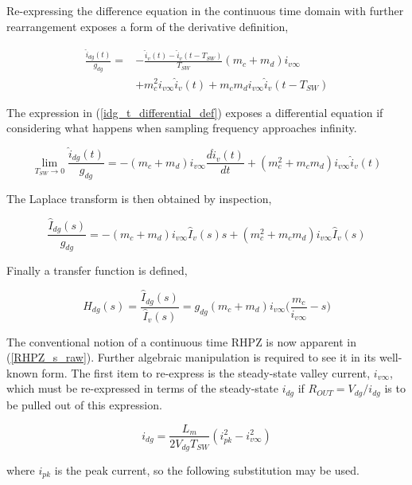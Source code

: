 \documentclass[conference]{IEEEtran}
\begin{document}
Re-expressing the difference equation in the continuous time domain with further rearrangement exposes a form of the derivative definition,

\begin{align}
	\frac{\hat{i}_{dg}(t)}{g_{dg}} =&  -\frac{\hat{i}_v(t) - \hat{i}_v (t-T_{SW})} {T_{SW}}
	(m_c + m_d) i_{v\infty} \nonumber \\
	&+	m_c^2 i_{v\infty}  \hat{i}_v(t)
	+ m_c m_d i_{v\infty}  \hat{i}_v(t-T_{SW})
	\label{idg_t_differential_def}
\end{align}

The expression in (\ref{idg_t_differential_def}) exposes a differential equation if considering what happens when sampling frequency approaches infinity.
	
\begin{equation}
\lim_{T_{SW} \to 0} \frac{\hat{i}_{dg}(t)}{g_{dg}} = -(m_c + m_d) i_{v\infty} \frac{d \hat{i}_v(t)}{dt}
+ 	( m_c^2 + m_c m_d ) i_{v\infty} \hat{i}_v(t) 
\end{equation}

The Laplace transform is then obtained by inspection,

\begin{equation}
	 \frac{\hat{I}_{dg}(s)}{g_{dg}} =  - (m_c + m_d) i_{v\infty}\hat{I}_{v}(s)s + ( m_c^2 + m_c m_d ) i_{v\infty} \hat{I}_{v}(s)
\end{equation}

Finally a transfer function is defined,

\begin{equation}
H_{dg} (s) = \frac{\hat{I}_{dg}(s)}{\hat{I}_{v}(s)} =  g_{dg} (m_c + m_d) i_{v\infty}
\big (\frac{m_c}{i_{v\infty}} - s \big )
\label{RHPZ_s_raw}
\end{equation}

The conventional notion of a continuous time RHPZ is now apparent in (\ref{RHPZ_s_raw}).  
Further algebraic manipulation is required to see it in its well-known form.  The first item to re-express is the steady-state valley current, $i_{v\infty}$, which must be re-expressed in terms of the steady-state $i_{dg}$ if $R_{OUT} = V_{dg}/i_{dg}$ is to be pulled out of this expression.

\begin{equation}
	i_{dg} = \frac{L_m}{2V_{dg}T_{SW}} (i_{pk}^2 - i_{v\infty}^2)
	\label{steady_state_idg}
\end{equation}

where $i_{pk}$ is the peak current, so the following substitution may be used.
\end{document}
